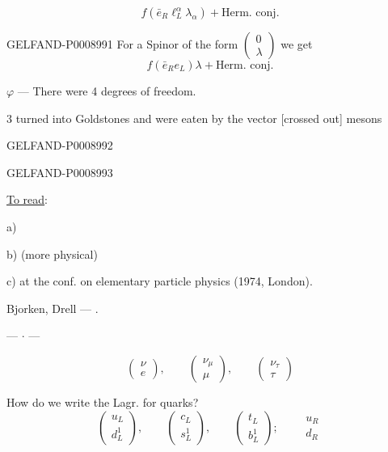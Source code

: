 \[
f\left(\bar e_R\ell_L^\alpha\lambda_\alpha\right)+\text{Herm. conj.}
\]


\begin{GelfandAdjacentEvidence}{GELFAND-P000899}{1}
For a Spinor of the form $\begin{pmatrix}0\\\lambda\end{pmatrix}$ we get
\[
f(\bar e_R e_L)\lambda+\text{Herm. conj.}
\]

$\varphi$ — There were 4 degrees of freedom.

3 turned into Goldstones and were eaten by the vector [crossed out] mesons
\end{GelfandAdjacentEvidence}
\begin{GelfandAdjacentEvidence}{GELFAND-P000899}{2}

\end{GelfandAdjacentEvidence}
\begin{GelfandAdjacentEvidence}{GELFAND-P000899}{3}


\uline{To read}:

a) 

b)  (more physical)

c)  at the conf. on elementary particle physics (1974, London).

Bjorken, Drell — .

\begin{center}— \(\cdot\) —\end{center}
\[
\begin{pmatrix}\nu\\e\end{pmatrix},\qquad
\begin{pmatrix}\nu_\mu\\\mu\end{pmatrix},\qquad
\begin{pmatrix}\nu_\tau\\\tau\end{pmatrix}
\]

How do we write the Lagr. for quarks?
\[
\begin{pmatrix}u_L\\d_L^1\end{pmatrix},\qquad
\begin{pmatrix}c_L\\s_L^1\end{pmatrix},\qquad
\begin{pmatrix}t_L\\b_L^1\end{pmatrix}\mathpunct{;}\qquad
\begin{matrix}u_R\\d_R\end{matrix}
\]
\end{GelfandAdjacentEvidence}
